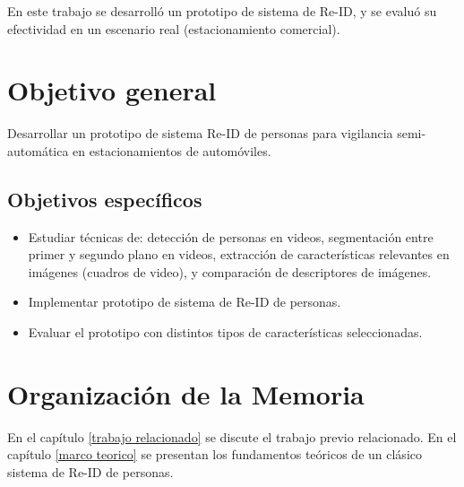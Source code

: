\documentclass[../memoria.tex]{subfiles}
\begin{document}
\indent En este trabajo se desarrolló un prototipo de sistema de Re-ID, y se evaluó su efectividad en un escenario real (estacionamiento comercial). %

\section{Objetivo general}
Desarrollar un prototipo de sistema Re-ID de personas para vigilancia semi-automática en estacionamientos de automóviles.
\subsection{Objetivos específicos}
\begin{itemize}
\item Estudiar técnicas de: detección de personas en videos, segmentación entre primer y segundo plano en videos, extracción de características relevantes en imágenes (cuadros de video), y comparación de descriptores de imágenes.
\item Implementar prototipo de sistema de Re-ID de personas.
\item Evaluar el prototipo con distintos tipos de características seleccionadas.
\end{itemize}

\section{Organización de la Memoria}
\indent En el capítulo \ref{trabajo relacionado} se discute el trabajo previo relacionado. En el capítulo \ref{marco teorico} se presentan los fundamentos teóricos de un clásico sistema de Re-ID de personas. %
\end{document}
